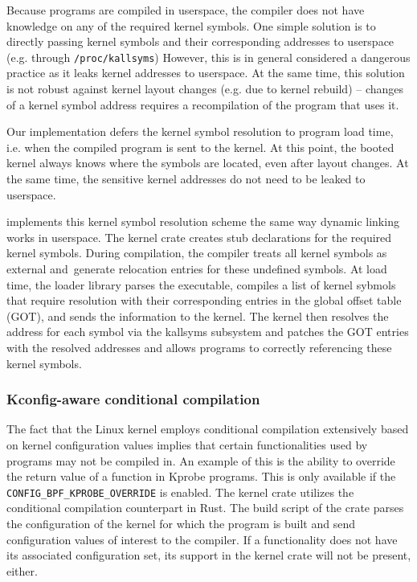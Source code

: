 Because \projname{} programs are compiled in userspace, the compiler does not
    have knowledge on any of the required kernel symbols.
One simple solution is to directly passing kernel symbols and their
    corresponding addresses to userspace (e.g. through \texttt{/proc/kallsyms})
However, this is in general considered a dangerous practice as it leaks kernel
    addresses to userspace.
At the same time, this solution is not robust against kernel layout changes
    (e.g. due to kernel rebuild) -- changes of a kernel symbol address requires
    a recompilation of the \projname{} program that uses it.

Our implementation defers the kernel symbol resolution to program load time,
    i.e. when the compiled \projname{} program is sent to the kernel.
At this point, the booted kernel always knows where the symbols are located,
    even after layout changes.
At the same time, the sensitive kernel addresses do not need to be leaked to
    userspace.

\projname{} implements this kernel symbol resolution scheme the same way
    dynamic linking works in userspace.
The \projname{} kernel crate creates stub declarations for the required kernel
    symbols.
During compilation, the compiler treats all kernel symbols as external and\
    generate relocation entries for these undefined symbols.
At load time, the loader library parses the executable, compiles a list of
    kernel sybmols that require resolution with their corresponding entries in
    the global offset table (GOT), and sends the information to the kernel.
The kernel then resolves the address for each symbol via the kallsyms subsystem
    and patches the GOT entries with the resolved addresses and allows programs
    to correctly referencing these kernel symbols.

\subsubsection{Kconfig-aware conditional compilation}
The fact that the Linux kernel employs conditional compilation extensively
    based on kernel configuration values implies that certain functionalities
    used by \projname{} programs may not be compiled in.
An example of this is the ability to override the return value of a function in
    Kprobe programs.
This is only available if the \texttt{CONFIG\_BPF\_KPROBE\_OVERRIDE} is
    enabled.
The \projname{} kernel crate utilizes the conditional compilation counterpart
    in Rust.
The build script of the crate parses the configuration of the kernel for which
    the program is built and send configuration values of interest to the
    compiler.
If a functionality does not have its associated configuration set, its support
    in the kernel crate will not be present, either.

